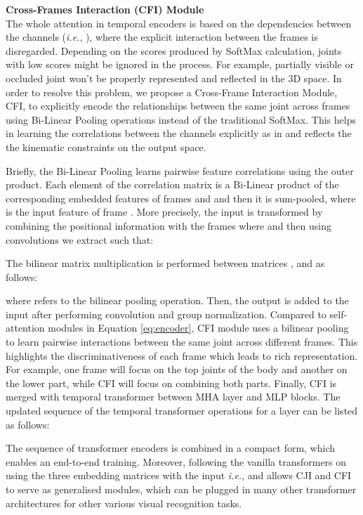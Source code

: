 \documentclass[runningheads]{llncs}
\newcommand{\latinphrase}[1]{\textit{#1}}
\newcommand{\ie}{\latinphrase{i.e.}\xspace}
\begin{document}
\textbf{Cross-Frames Interaction (CFI) Module}\\
The whole attention in temporal encoders is based on the dependencies between the channels (\ie, ), where the explicit interaction between the frames is disregarded. Depending on the scores produced by SoftMax calculation,  joints with low scores might be ignored in the process. For example, partially visible or occluded joint won't be properly represented and reflected in the 3D space. In order to resolve this problem, we propose a Cross-Frame Interaction Module, CFI, to explicitly encode the relationships between the same joint across frames using Bi-Linear Pooling operations \cite{yue2018compact} instead of the traditional SoftMax. This helps in learning the correlations between the channels explicitly as in \cite{hu2018squeeze} and reflects the the kinematic constraints on the output space. 

Briefly, the Bi-Linear Pooling learns pairwise feature correlations using the outer product.
Each element of the correlation matrix  is a Bi-Linear product of the corresponding embedded features of frames  and   and then it is sum-pooled, where  is the input feature of frame . More precisely, the input is transformed by combining the positional information with the frames where  and then using convolutions we extract  such that:
\vspace{-1em}

The bilinear  matrix multiplication is performed between matrices ,  and  as follows:
\vspace{-1em}

where  refers to the bilinear pooling operation. Then, the output is added to the input after performing convolution and group normalization. Compared to self-attention modules in Equation \ref{eq:encoder}, CFI module uses a bilinear pooling to learn pairwise interactions between the same joint across different frames. This highlights the discriminativeness of each frame which leads to rich representation. For example, one frame will focus on the top joints of the body and another on the lower part, while CFI will focus on combining both parts. Finally, CFI is merged with temporal transformer between MHA layer and MLP blocks. The updated sequence of the temporal transformer operations for a layer  can be listed as follows:

The sequence of transformer encoders is combined in a compact form, which enables an end-to-end training. Moreover, following the vanilla transformers \cite{poseformer} on using the three embedding matrices with the input \ie,  and  allows CJI and CFI to serve as generalised modules, which can be plugged in many other transformer architectures for other various visual recognition tasks.
\end{document}
